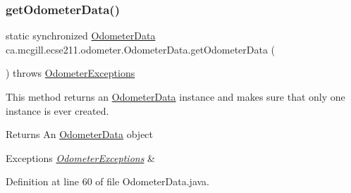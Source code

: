 \subsubsection{\texorpdfstring{get\+Odometer\+Data()}{getOdometerData()}}
{\footnotesize\ttfamily static synchronized \hyperlink{classca_1_1mcgill_1_1ecse211_1_1odometer_1_1_odometer_data}{Odometer\+Data} ca.\+mcgill.\+ecse211.\+odometer.\+Odometer\+Data.\+get\+Odometer\+Data (\begin{DoxyParamCaption}{ }\end{DoxyParamCaption}) throws \hyperlink{classca_1_1mcgill_1_1ecse211_1_1odometer_1_1_odometer_exceptions}{Odometer\+Exceptions}\hspace{0.3cm}{\ttfamily [static]}}

This method returns an \hyperlink{classca_1_1mcgill_1_1ecse211_1_1odometer_1_1_odometer_data}{Odometer\+Data} instance and makes sure that only one instance is ever created.

\begin{DoxyReturn}{Returns}
An \hyperlink{classca_1_1mcgill_1_1ecse211_1_1odometer_1_1_odometer_data}{Odometer\+Data} object 
\end{DoxyReturn}

\begin{DoxyExceptions}{Exceptions}
{\em \hyperlink{classca_1_1mcgill_1_1ecse211_1_1odometer_1_1_odometer_exceptions}{Odometer\+Exceptions}} & \\
\hline
\end{DoxyExceptions}


Definition at line 60 of file Odometer\+Data.\+java.


